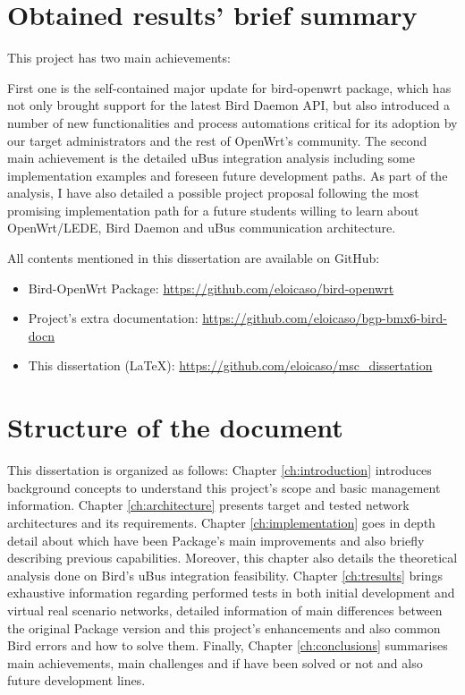 \section{Obtained results' brief summary}
This project has two main achievements:

First one is the self-contained major update for bird-openwrt package, which has not only brought support for the latest Bird Daemon API, but also introduced a number of new functionalities and process automations critical for its adoption by our target administrators and the rest of OpenWrt's community.
The second main achievement is the detailed uBus integration analysis including some implementation examples and foreseen future development paths. As part of the analysis, I have also detailed a possible project proposal following the most promising implementation path for a future students willing to learn about OpenWrt/LEDE, Bird Daemon and uBus communication architecture.

All contents mentioned in this dissertation are available on GitHub:

\begin{itemize}
    \item Bird-OpenWrt Package: \href{https://github.com/eloicaso/bird-openwrt}{https://github.com/eloicaso/bird-openwrt}
    \item Project's extra documentation: \href{https://github.com/eloicaso/bgp-bmx6-bird-docn}{https://github.com/eloicaso/bgp-bmx6-bird-docn}
    \item This dissertation (LaTeX): \href{https://github.com/eloicaso/msc_dissertation}{https://github.com/eloicaso/msc\_dissertation}
\end{itemize}

\section{Structure of the document}
\label{sec:sod}
This dissertation is organized as follows: Chapter \ref{ch:introduction} introduces background concepts to understand this project's scope and basic management information. Chapter \ref{ch:architecture} presents target and tested network architectures and its requirements. Chapter \ref{ch:implementation} goes in depth detail about which have been Package's main improvements and also briefly describing previous capabilities. Moreover, this chapter also details the theoretical analysis done on Bird's uBus integration feasibility. Chapter \ref{ch:tresults} brings exhaustive information regarding performed tests in both initial development and virtual real scenario networks, detailed information of main differences between the original Package version and this project's enhancements and also common Bird errors and how to solve them. Finally, Chapter \ref{ch:conclusions} summarises main achievements, main challenges and if have been solved or not and also future development lines. 

